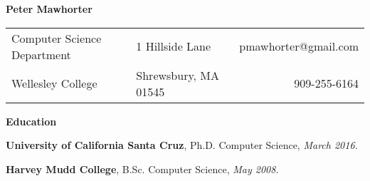 \documentclass[11pt]{article}
\newenvironment{sct}[1]{%
  \vspace{8pt plus 2pt minus 4pt}\textbf{\Large #1} \hrulefill\vspace{6pt}
  \begin{adjustwidth}{6pt}{0pt}
}{%
  \end{adjustwidth}
}
\newcommand{\edu}[3]{\textbf{#1}, #2, \textit{#3.}}
\begin{document}
\textbf{\huge Peter Mawhorter }\hrulefill\vspace{6pt}

\begin{tabularx}{\textwidth}{X X r}
Computer Science Department & 1 Hillside Lane & pmawhorter@gmail.com \\
Wellesley College & Shrewsbury, MA 01545 & 909-255-6164 \\
\end{tabularx}

\begin{sct}{Education}

\edu{University of California Santa Cruz}{Ph.D. Computer Science}{March 2016}

\edu{Harvey Mudd College}{B.Sc. Computer Science}{May 2008}

\end{sct}
\end{document}
